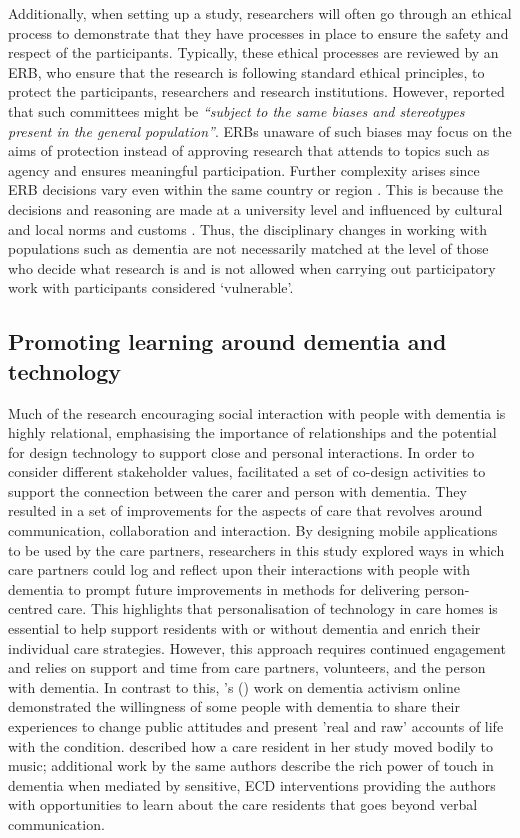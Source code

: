 Additionally, when setting up a study, researchers will often go through an ethical process to demonstrate that they have processes in place to ensure the safety and respect of the participants. Typically, these ethical processes are reviewed by an ERB, who ensure that the research is following standard ethical principles, to protect the participants, researchers and research institutions. However, \cite{pachana_can_2014} reported that such committees might be \textit{``subject to the same biases and stereotypes present in the general population''}. ERBs unaware of such biases may focus on the aims of protection instead of approving research that attends to topics such as agency and ensures meaningful participation. Further complexity arises since ERB decisions vary even within the same country or region \citep{edwards_research_2004}. This is because the decisions and reasoning are made at a university level and influenced by cultural and local norms and customs \citep{flicker_ethical_2007}. Thus, the disciplinary changes in working with populations such as dementia are not necessarily matched at the level of those who decide what research is and is not allowed when carrying out participatory work with participants considered `vulnerable'.

\subsection{Promoting learning around dementia and technology}
\label{BL:gap:Learning}
Much of the research encouraging social interaction with people with dementia is highly relational, emphasising the importance of relationships and the potential for design technology to support close and personal interactions. In order to consider different stakeholder values, \cite{maiden_computing_2013} facilitated a set of co-design activities to support the connection between the carer and person with dementia. They resulted in a set of improvements for the aspects of care that revolves around communication, collaboration and interaction. By designing mobile applications to be used by the care partners, researchers in this study explored ways in which care partners could log and reflect upon their interactions with people with dementia to prompt future improvements in methods for delivering person-centred care. This highlights that personalisation of technology in care homes is essential to help support residents with or without dementia and enrich their individual care strategies. However, this approach requires continued engagement and relies on support and time from care partners, volunteers, and the person with dementia. In contrast to this, \citeauthor{lazar_safe_2019}'s (\citeyear{lazar_safe_2019}) work on dementia activism online demonstrated the willingness of some people with dementia to share their experiences to change public attitudes and present 'real and raw' accounts of life with the condition. \cite{morrissey_im_2016} described how a care resident in her study moved bodily to music; additional work by the same authors describe the rich power of touch in dementia when mediated by sensitive, ECD interventions providing  the authors with opportunities to learn about the care residents that goes beyond verbal communication. 

